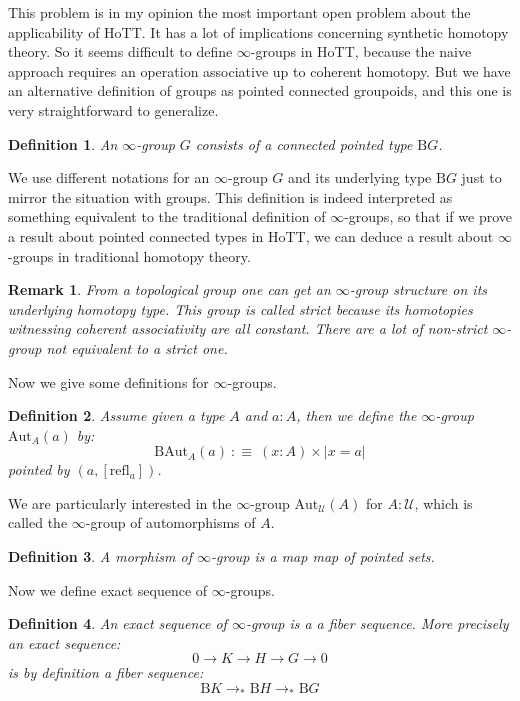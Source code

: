 \documentclass{article}
\newcommand{\U}{{\mathcal U}}
\renewcommand{\r}{\rightarrow}
\newcommand{\refl}{\mathrm{refl}}
\newcommand{\B}{\mathrm{B}}
\newcommand{\Aut}{\mathrm{Aut}}
\newtheorem{definition}{Definition}
\newtheorem{remark}{Remark}
\begin{document}
This problem is in my opinion the most important open problem about the applicability of HoTT. It has a lot of implications concerning synthetic homotopy theory. So it seems difficult to define $\infty$-groups in HoTT, because the naive approach requires an operation associative up to coherent homotopy. But we have an alternative definition of groups as pointed connected groupoids, and this one is very straightforward to generalize.

\begin{definition}
An $\infty$-group $G$ consists of a connected pointed type $\B G$.
\end{definition}

We use different notations for an $\infty$-group $G$ and its underlying type $\B G$ just to mirror the situation with groups. This definition is indeed interpreted as something equivalent to the traditional definition of $\infty$-groups, so that if we prove a result about pointed connected types in HoTT, we can deduce a result about $\infty$-groups in traditional homotopy theory. 

\begin{remark}
From a topological group one can get an $\infty$-group structure on its underlying homotopy type. This group is called strict because its homotopies witnessing coherent associativity are all constant. There are a lot of non-strict $\infty$-group not equivalent to a strict one.%
\end{remark}

Now we give some definitions for $\infty$-groups.

\begin{definition}
Assume given a type $A$ and $a:A$, then we define the $\infty$-group $\Aut_A(a)$ by:
\[\B \Aut_A(a) \ :\equiv\ (x:A)\times |x=a|\]
pointed by $(a,[\refl_a])$.
\end{definition}

We are particularly interested in the $\infty$-group $\Aut_\U(A)$ for $A:\U$, which is called the $\infty$-group of automorphisms of $A$.

\begin{definition}
A morphism of $\infty$-group is a map map of pointed sets. 
\end{definition}

Now we define exact sequence of $\infty$-groups.

\begin{definition}
An exact sequence of $\infty$-group is a a fiber sequence. More precisely an exact sequence:
\[0\r K\r H\r G\r 0\]
is by definition a fiber sequence:
\[\B K\r_*\B H\r_*\B G\]
\end{definition}
\end{document}
